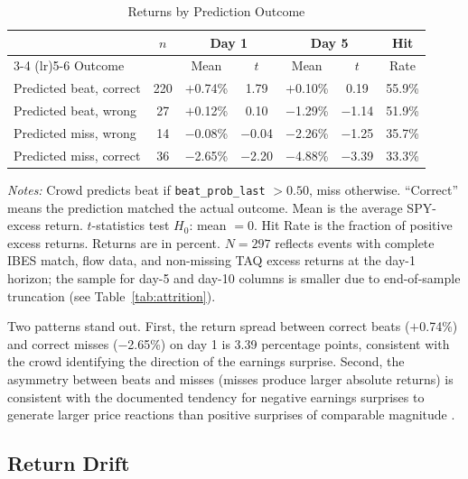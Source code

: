 \documentclass[11pt]{article}
\begin{document}
\begin{table}[htbp]
\centering
\begin{threeparttable}
\caption{Returns by Prediction Outcome}
\label{tab:four_cell}
\begin{tabular}{lcccccc}
\toprule
& $n$ & \multicolumn{2}{c}{Day 1} & \multicolumn{2}{c}{Day 5} & Hit \\
\cmidrule(lr){3-4} \cmidrule(lr){5-6}
Outcome & & Mean & $t$ & Mean & $t$ & Rate \\
\midrule
Predicted beat, correct & 220 & $+$0.74\% & 1.79 & $+$0.10\% & 0.19 & 55.9\% \\
Predicted beat, wrong & 27 & $+$0.12\% & 0.10 & $-$1.29\% & $-$1.14 & 51.9\% \\
Predicted miss, wrong & 14 & $-$0.08\% & $-$0.04 & $-$2.26\% & $-$1.25 & 35.7\% \\
Predicted miss, correct & 36 & $-$2.65\% & $-$2.20 & $-$4.88\% & $-$3.39 & 33.3\% \\
\bottomrule
\end{tabular}
\begin{tablenotes}
\small
\item \textit{Notes:} Crowd predicts beat if \texttt{beat\_prob\_last} $> 0.50$, miss otherwise. ``Correct'' means the prediction matched the actual outcome. Mean is the average SPY-excess return. $t$-statistics test $H_0$: mean $= 0$. Hit Rate is the fraction of positive excess returns. Returns are in percent. $N = 297$ reflects events with complete IBES match, flow data, and non-missing TAQ excess returns at the day-1 horizon; the sample for day-5 and day-10 columns is smaller due to end-of-sample truncation (see Table~\ref{tab:attrition}).
\end{tablenotes}
\end{threeparttable}
\end{table}

Two patterns stand out. First, the return spread between correct beats ($+$0.74\%) and correct misses ($-$2.65\%) on day 1 is 3.39 percentage points, consistent with the crowd identifying the direction of the earnings surprise. Second, the asymmetry between beats and misses (misses produce larger absolute returns) is consistent with the documented tendency for negative earnings surprises to generate larger price reactions than positive surprises of comparable magnitude \citep{skinner1994earnings}.

\subsection{Return Drift}
\end{document}
